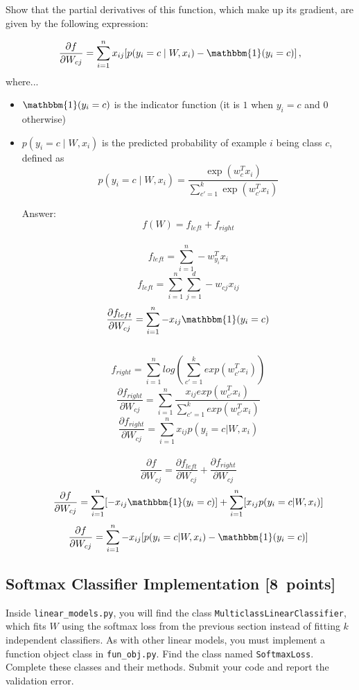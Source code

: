 \documentclass{article}
\newcommand{\blu}[1]{{\textcolor{blu}{#1}}}
\newenvironment{answer}{\par\begingroup\color{gre}Answer: }{\endgroup}
\let\ask\blu
\newcommand\pts[1]{\textcolor{pointscolour}{[#1~points]}}
\begin{document}
\ask{Show that the partial derivatives of this function, which make up its gradient, are given by the following expression:}

\[
\frac{\partial f}{\partial W_{cj}} = \sum_{i=1}^n x_{ij}[p(y_i=c \mid W,x_i) - \mathbbm{1}(y_i = c)] \, ,
\]
where...
\begin{itemize}
\item $\mathbbm{1}(y_i = c)$ is the indicator function (it is $1$ when $y_i=c$ and $0$ otherwise)
\item $p(y_i=c \mid W, x_i)$ is the predicted probability of example $i$ being class $c$, defined as
\[
p(y_i=c \mid W, x_i) = \frac{\exp(w_c^Tx_i)}{\sum_{c'=1}^k\exp(w_{c'}^Tx_i)}
\]
\newpage
\begin{answer}
\[
    f(W) = f_{left} + f_{right}
\]
\\
\[
    f_{left} = \sum_{i = 1}^n - w_{y_i}^T x_i
\]
\[
    f_{left} = \sum_{i = 1}^n \sum_{j = 1}^d - w_{cj} x_{ij}
\]
\[
    \frac{\partial f_{left}}{\partial W_{cj}} = \sum_{i = 1}^n - x_{ij} \mathbbm{1}(y_i = c)
\]
\\
\[
    f_{right} = \sum_{i = 1}^n log(\sum_{c' = 1}^k exp(w_{c'}^T x_i))
\]
\[
    \frac{\partial f_{right}}{\partial W_{cj}} = \sum_{i = 1}^n \frac{x_{ij}exp(w_{c'}^T x_i)}{\sum_{c' = 1}^k exp(w_{c'}^T x_i)}
\]
\[
    \frac{\partial f_{right}}{\partial W_{cj}} = \sum_{i = 1}^n x_{ij}p(y_i = c | W,x_i)
\]
\\
\[
    \frac{\partial f}{\partial W_{cj}} = \frac{\partial f_{left}}{\partial W_{cj}}  + \frac{\partial f_{right}}{\partial W_{cj}} 
\]
\[
    \frac{\partial f}{\partial W_{cj}} = \sum_{i = 1}^n [- x_{ij} \mathbbm{1}(y_i = c)] + \sum_{i = 1}^n [x_{ij} p(y_i = c | W,x_i)]
\]
\[
    \frac{\partial f}{\partial W_{cj}} = \sum_{i = 1}^n - x_{ij} [p(y_i = c | W,x_i) - \mathbbm{1}(y_i = c)]
\]

\end{answer}

\end{itemize}
\newpage
\subsection{Softmax Classifier Implementation \pts{8}}

Inside \verb|linear_models.py|, you will find the class \verb|MulticlassLinearClassifier|, which fits $W$ using the softmax loss from the previous section instead of fitting $k$ independent classifiers. As with other linear models, you must implement a function object class in \verb|fun_obj.py|. Find the class named \verb|SoftmaxLoss|. Complete these classes and their methods. \ask{Submit your code and report the validation error.}
\end{document}
